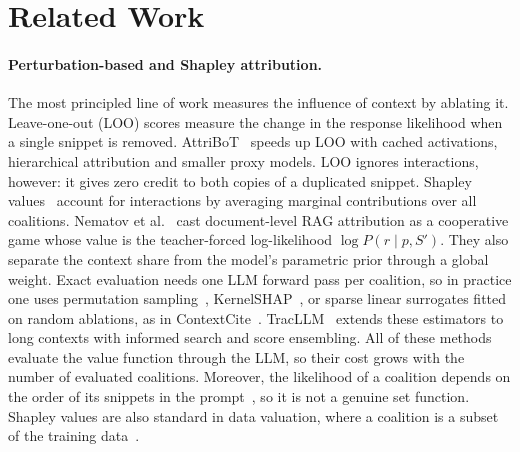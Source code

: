 \documentclass{article}
\begin{document}

\section{Related Work}
\label{sec:related_work}

\paragraph{Perturbation-based and Shapley attribution.}
The most principled line of work measures the influence of context by ablating it. Leave-one-out (LOO) scores measure the change in the response likelihood when a single snippet is removed. AttriBoT~\cite{liu2025attribot} speeds up LOO with cached activations, hierarchical attribution and smaller proxy models. LOO ignores interactions, however: it gives zero credit to both copies of a duplicated snippet. Shapley values~\cite{shapley1953value} account for interactions by averaging marginal contributions over all coalitions. Nematov et al.~\cite{nematov2025source} cast document-level RAG attribution as a cooperative game whose value is the teacher-forced log-likelihood $\log P(r \mid p, S')$. They also separate the context share from the model's parametric prior through a global weight. Exact evaluation needs one LLM forward pass per coalition, so in practice one uses permutation sampling~\cite{castro2009polynomial}, KernelSHAP~\cite{lundberg2017unified}, or sparse linear surrogates fitted on random ablations, as in ContextCite~\cite{cohen2024contextcite}. TracLLM~\cite{wang2025tracllm} extends these estimators to long contexts with informed search and score ensembling. All of these methods evaluate the value function through the LLM, so their cost grows with the number of evaluated coalitions. Moreover, the likelihood of a coalition depends on the order of its snippets in the prompt~\cite{liu2024lost}, so it is not a genuine set function. Shapley values are also standard in data valuation, where a coalition is a subset of the training data~\cite{ghorbani2019data, kwon2022beta}.
\end{document}
